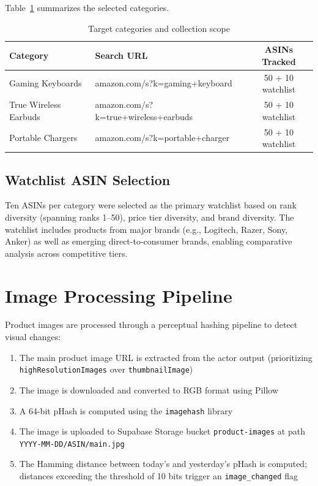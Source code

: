 Table~\ref{tab:categories} summarizes the selected categories.

\begin{table}[H]
  \centering
  \begin{tabular}{llc}
    \toprule
    \textbf{Category} & \textbf{Search URL} & \textbf{ASINs Tracked} \\
    \midrule
    Gaming Keyboards   & amazon.com/s?k=gaming+keyboard      & 50 + 10 watchlist \\
    True Wireless Earbuds & amazon.com/s?k=true+wireless+earbuds & 50 + 10 watchlist \\
    Portable Chargers  & amazon.com/s?k=portable+charger     & 50 + 10 watchlist \\
    \bottomrule
  \end{tabular}
  \caption{Target categories and collection scope}
  \label{tab:categories}
\end{table}

\subsection{Watchlist ASIN Selection}
Ten ASINs per category were selected as the primary watchlist based on rank
diversity (spanning ranks 1–50), price tier diversity, and brand diversity.
The watchlist includes products from major brands (e.g., Logitech, Razer, Sony,
Anker) as well as emerging direct-to-consumer brands, enabling comparative analysis
across competitive tiers.

\section{Image Processing Pipeline}

Product images are processed through a perceptual hashing pipeline to detect
visual changes:

\begin{enumerate}
  \item The main product image URL is extracted from the actor output
  (prioritizing \texttt{highResolutionImages} over \texttt{thumbnailImage})
  \item The image is downloaded and converted to RGB format using Pillow
  \item A 64-bit pHash is computed using the \texttt{imagehash} library
  \item The image is uploaded to Supabase Storage bucket \texttt{product-images}
  at path \texttt{YYYY-MM-DD/ASIN/main.jpg}
  \item The Hamming distance between today's and yesterday's pHash is computed;
  distances exceeding the threshold of 10 bits trigger an \texttt{image\_changed} flag
\end{enumerate}

